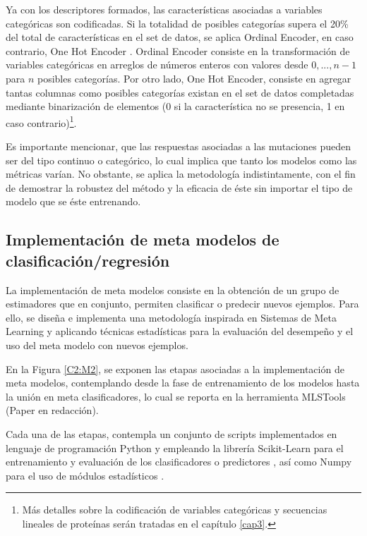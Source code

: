 Ya con los descriptores formados, las características asociadas a variables categóricas son codificadas. Si la totalidad de posibles categorías supera el 20\% del total de características en el set de datos, se aplica Ordinal Encoder, en caso contrario, One Hot Encoder \cite{pedregosa2011scikit}. Ordinal Encoder consiste en la transformación de variables categóricas en arreglos de números enteros con valores desde $0,...,n-1$ para $n$ posibles categorías. Por otro lado, One Hot Encoder, consiste en agregar tantas columnas como posibles categorías existan en el set de datos completadas mediante binarización de elementos (0 si la característica no se presencia, 1 en caso contrario)\footnote{Más detalles sobre la codificación de variables categóricas y secuencias lineales de proteínas serán tratadas en el capítulo \ref{cap3}.}.

Es importante mencionar, que las respuestas asociadas a las mutaciones pueden ser del tipo continuo o categórico, lo cual implica que tanto los modelos como las métricas varían. No obstante, se aplica la metodología indistintamente, con el fin de demostrar la robustez del método y la eficacia de éste sin importar el tipo de modelo que se éste entrenando.

\subsection{Implementación de meta modelos de clasificación/regresión}

La implementación de meta modelos consiste en la obtención de un grupo de estimadores que en conjunto, permiten clasificar o predecir nuevos ejemplos. Para ello, se diseña e implementa una metodología inspirada en Sistemas de Meta Learning y aplicando técnicas estadísticas para la evaluación del desempeño y el uso del meta modelo con nuevos ejemplos.

En la Figura \ref{C2:M2}, se exponen las etapas asociadas a la implementación de meta modelos, contemplando desde la fase de entrenamiento de los modelos hasta la unión en meta clasificadores, lo cual se reporta en la herramienta MLSTools (Paper en redacción). 

Cada una de las etapas, contempla un conjunto de scripts implementados en lenguaje de programación Python y empleando la librería Scikit-Learn para el entrenamiento y evaluación de los clasificadores o predictores \cite{pedregosa2011scikit}, así como Numpy para el uso de módulos estadísticos \cite{doi:10.1109/MCSE.2011.37}.


